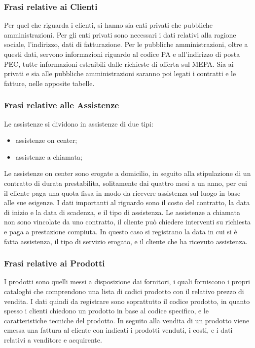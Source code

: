 \subsubsection{Frasi relative ai Clienti}
Per quel che riguarda i clienti, si hanno sia enti privati che pubbliche amministrazioni. Per gli enti privati sono necessari i dati relativi alla ragione sociale, l'indirizzo, dati di fatturazione. Per le pubbliche amministrazioni, oltre a questi dati, servono informazioni riguardo al codice PA e all'indirizzo di posta PEC, tutte informazioni estraibili dalle richieste di offerta sul MEPA. \newline
Sia ai privati e sia alle pubbliche amministrazioni saranno poi legati i contratti e le fatture, nelle apposite tabelle.

\subsubsection{Frasi relative alle Assistenze}
Le assistenze si dividono in assistenze di due tipi:
\begin{itemize}
\item	assistenze on center;
\item	assistenze a chiamata;
\end{itemize}
Le assistenze on center sono erogate a domicilio, in seguito alla stipulazione di un contratto di durata prestabilita, solitamente dai quattro mesi a un anno, per cui il cliente paga una quota fissa in modo da ricevere assistenza sul luogo in base alle sue esigenze.\newline
I dati importanti al riguardo sono il costo del contratto, la data di inizio e la data di scadenza, e il tipo di assistenza.\newline
Le assistenze a chiamata non sono vincolate da uno contratto, il cliente può chiedere interventi su richiesta e paga a prestazione compiuta.
In questo caso si registrano la data in cui si è fatta assistenza, il tipo di servizio erogato, e il cliente che ha ricevuto assistenza.


\subsubsection{Frasi relative ai Prodotti}
I prodotti sono quelli messi a disposizione dai fornitori, i quali forniscono i propri cataloghi che comprendono una lista di codici prodotto con il relativo prezzo di vendita. I dati quindi da registrare sono soprattutto il codice prodotto, in quanto spesso i clienti chiedono un prodotto in base al codice specifico, e le caratteristiche tecniche del prodotto.\newline
In seguito alla vendita di un prodotto viene emessa una fattura al cliente con indicati i prodotti venduti, i costi, e i dati relativi a venditore e acquirente.

